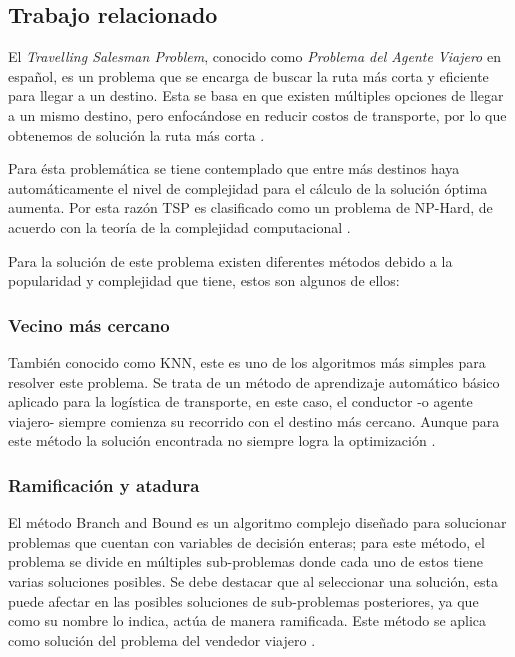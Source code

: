 \documentclass[journal]{IEEEtran}
\begin{document}
        \subsection{Trabajo relacionado}
        
            El \emph{Travelling Salesman Problem}, conocido como \emph{Problema del Agente Viajero} en español, es un problema que se encarga de buscar la ruta más corta y eficiente para llegar a un destino. Esta se basa en que existen múltiples opciones de llegar a un mismo destino, pero enfocándose en reducir costos de transporte, por lo que obtenemos de solución la ruta más corta \cite{trevelingProb}.
    
            Para ésta problemática se tiene contemplado que entre más destinos haya automáticamente el nivel de complejidad para el cálculo de la solución óptima aumenta. Por esta razón TSP es clasificado como un problema de NP-Hard, de acuerdo con la teoría de la complejidad computacional \cite{trevelingProb}.
    
            Para la solución de este problema existen diferentes métodos debido a la popularidad y complejidad que tiene, estos son algunos de ellos:
            
            \subsubsection{Vecino más cercano}
            
                También conocido como KNN, este es uno de los algoritmos más simples para resolver este problema. Se trata de un método de aprendizaje automático básico aplicado para la logística de transporte, en este caso, el conductor -o agente viajero- siempre comienza su recorrido con el destino más cercano. Aunque para este método la solución encontrada no siempre logra la optimización \cite{trevelingProb}.
    
            \subsubsection{Ramificación y atadura}
            
                El método Branch and Bound es un algoritmo complejo diseñado para solucionar problemas que cuentan con variables de decisión enteras; para este método, el problema se divide en múltiples sub-problemas donde cada uno de estos tiene varias soluciones posibles. Se debe destacar que al seleccionar una solución, esta puede afectar en las posibles soluciones de sub-problemas posteriores, ya que como su nombre lo indica, actúa de manera ramificada. Este método se aplica como solución del problema del vendedor viajero \cite{trevelingProb}.
    
\end{document}
